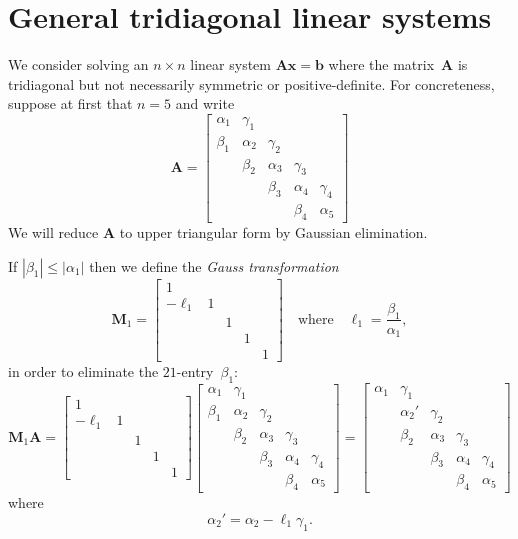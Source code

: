 \chapter{General tridiagonal linear systems}

We consider solving an $n\times n$ linear system 
$\boldsymbol{A}\boldsymbol{x}=\boldsymbol{b}$ where the matrix~$\boldsymbol{A}$
is tridiagonal but not necessarily symmetric or positive-definite.  For concreteness,
suppose at first that $n=5$ and write
\[
\boldsymbol{A}=\begin{bmatrix}
\alpha_1&\gamma_1&        &        &\\
 \beta_1&\alpha_2&\gamma_2&        &\\
        & \beta_2&\alpha_3&\gamma_3&\\
        &        & \beta_3&\alpha_4&\gamma_4\\
        &        &        & \beta_4&\alpha_5
\end{bmatrix}
\]
We will reduce $\boldsymbol{A}$ to upper triangular form by Gaussian 
elimination.  

If $|\beta_1|\le|\alpha_1|$ then we define the \emph{Gauss transformation}
\[
\boldsymbol{M}_1=\begin{bmatrix}
     1& & & &\\
-\ell_1&1& & &\\
      & &1& &\\
      & & &1&\\
      & & & &1
\end{bmatrix}
\quad\text{where}\quad\ell_1=\frac{\beta_1}{\alpha_1},
\]
in order to eliminate the $21$-entry~$\beta_1$:
\[
\boldsymbol{M}_1\boldsymbol{A}=
\begin{bmatrix}
      1& & & &\\
-\ell_1&1& & &\\
       & &1& &\\
       & & &1&\\
       & & & &1
\end{bmatrix}
\begin{bmatrix}
\alpha_1&\gamma_1&        &        &\\
 \beta_1&\alpha_2&\gamma_2&        &\\
        & \beta_2&\alpha_3&\gamma_3&\\
        &        & \beta_3&\alpha_4&\gamma_4\\
        &        &        & \beta_4&\alpha_5
\end{bmatrix}
=\begin{bmatrix}
\alpha_1& \gamma_1&        &        &\\
        &\alpha_2'&\gamma_2&        &\\
        &  \beta_2&\alpha_3&\gamma_3&\\
        &         & \beta_3&\alpha_4&\gamma_4\\
        &         &        & \beta_4&\alpha_5
\end{bmatrix}
\]
where
\[
\alpha_2'=\alpha_2-\ell_1\gamma_1.
\]

